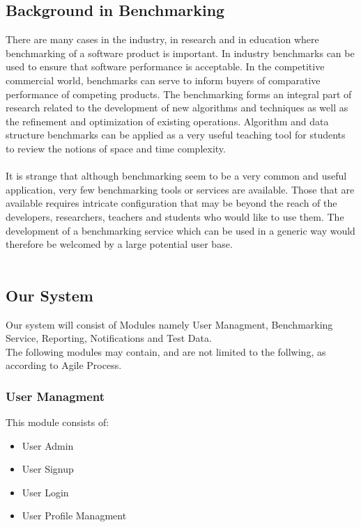 \subsection{Background in Benchmarking}
There are many cases in the industry, in research and in education where benchmarking of
a software product is important. In industry benchmarks can be used to ensure that software
performance is acceptable. In the competitive commercial world, benchmarks can serve to inform
buyers of comparative performance of competing products. The benchmarking forms an integral
part of research related to the development of new algorithms and techniques as well as the refinement
and optimization of existing operations. Algorithm and data structure benchmarks can be applied
as a very useful teaching tool for students to review the notions of space and time complexity.
\\
\\
It is strange that although benchmarking seem to be a very common and useful application, very few benchmarking tools or services are available. Those that are available requires intricate configuration that may be beyond the reach of the developers, researchers,
teachers and students who would like to use them. The development of a benchmarking service which can be used in a generic way would therefore be welcomed by a large
potential user base.
\\
\\
\subsection{Our System}
Our system will consist of  Modules namely User Managment, Benchmarking Service, Reporting, Notifications and Test Data.\\
The following modules may contain, and are not limited to the follwing, as according to Agile Process.

\subsubsection{User Managment}
This module consists of:
\begin{itemize}
  \item User Admin
  \item User Signup
  \item User Login
  \item User Profile Managment
\end{itemize}

